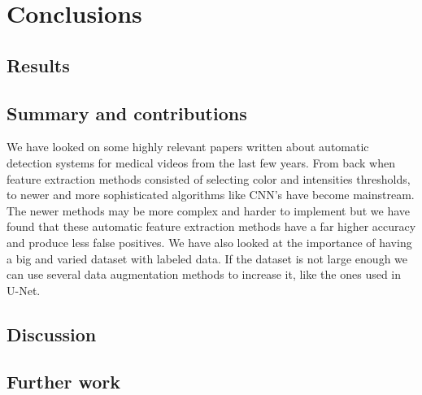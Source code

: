 \documentclass[thesis.tex]{subfiles}
\begin{document}
\chapter{Conclusions} \label{chap:conclusions}


\section{Results} \label{sec:C5-results}


\section{Summary and contributions} \label{sec:summary_and_contributions}
We have looked on some highly relevant papers written about automatic detection systems for medical videos from the last few years. From back when feature extraction methods consisted of selecting color and intensities thresholds, to newer and more sophisticated algorithms like CNN's have become mainstream. The newer methods may be more complex and harder to implement but we have found that these automatic feature extraction methods have a far higher accuracy and produce less false positives. We have also looked at the importance of having a big and varied dataset with labeled data. If the dataset is not large enough we can use several data augmentation methods to increase it, like the ones used in U-Net. 


\section{Discussion} \label{sec:discussion}



\section{Further work} \label{sec:further_work}
\end{document}
